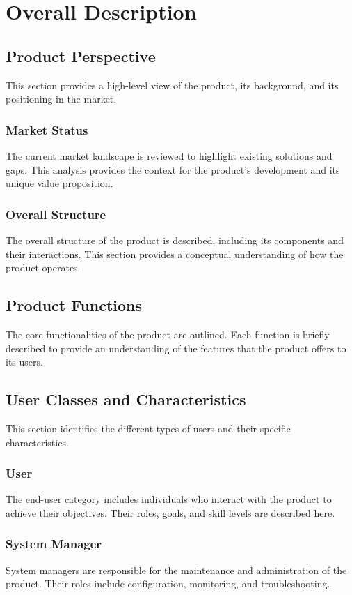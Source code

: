 \chapter{Overall Description}
\label{ch:overall_desc}

\section{Product Perspective}
This section provides a high-level view of the product, its background, and its positioning in the market.

\subsection{Market Status}
The current market landscape is reviewed to highlight existing solutions and gaps. This analysis provides the context for the product's development and its unique value proposition.

\subsection{Overall Structure}
The overall structure of the product is described, including its components and their interactions. This section provides a conceptual understanding of how the product operates.

\section{Product Functions}
The core functionalities of the product are outlined. Each function is briefly described to provide an understanding of the features that the product offers to its users.

\section{User Classes and Characteristics}
This section identifies the different types of users and their specific characteristics.

\subsection{User}
The end-user category includes individuals who interact with the product to achieve their objectives. Their roles, goals, and skill levels are described here.

\subsection{System Manager}
System managers are responsible for the maintenance and administration of the product. Their roles include configuration, monitoring, and troubleshooting.


